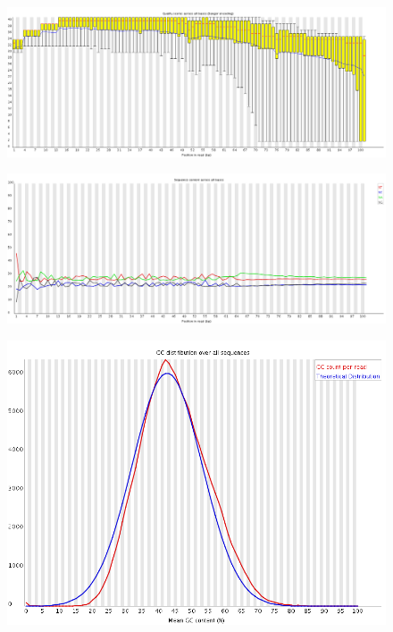 \documentclass{article}
\begin{document}
    \begin{figure}[htbp]
      \centering
      \includegraphics[width=1.0\linewidth] {fastqc/5_120719_BD158KACXX_1_nophix-sort-dup_fastqc/Images/per_base_quality.png}
      \caption{}
    \end{figure}
    \begin{figure}[htbp]
      \centering
      \includegraphics[width=0.85\linewidth] {fastqc/5_120719_BD158KACXX_1_nophix-sort-dup_fastqc/Images/per_base_sequence_content.png}
      \caption{}
    \end{figure}
    \begin{figure}[htbp]
      \centering
      \includegraphics[width=0.85\linewidth] {fastqc/5_120719_BD158KACXX_1_nophix-sort-dup_fastqc/Images/per_sequence_gc_content.png}
      \caption{}
    \end{figure}
\end{document}
